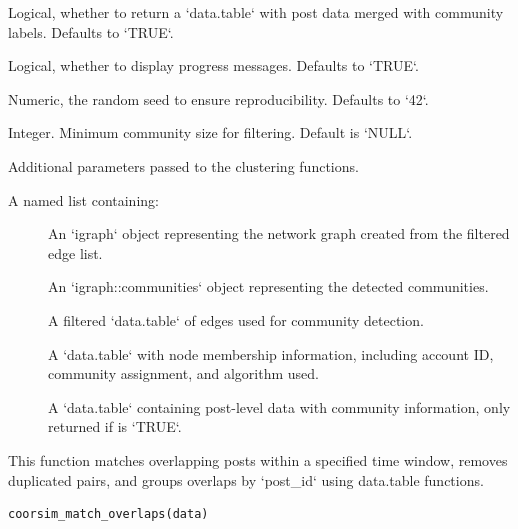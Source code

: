 \documentclass[a4paper]{book}
\begin{document}
\begin{Arguments}
\begin{ldescription}
\item[\code{return\_post\_dt}] Logical, whether to return a `data.table` with post data merged with community labels. 
Defaults to `TRUE`.

\item[\code{verbose}] Logical, whether to display progress messages. Defaults to `TRUE`.

\item[\code{seed}] Numeric, the random seed to ensure reproducibility. Defaults to `42`.

\item[\code{min\_comm\_size}] Integer. Minimum community size for filtering. Default is `NULL`.

\item[\code{...}] Additional parameters passed to the clustering functions.
\end{ldescription}
\end{Arguments}
%
\begin{Value}
A named list containing:
\begin{description}

\item[] An `igraph` object representing the network graph created from the filtered edge list.
\item[] An `igraph::communities` object representing the detected communities.
\item[] A filtered `data.table` of edges used for community detection.
\item[] A `data.table` with node membership information, including account ID, community assignment, and algorithm used.
\item[] A `data.table` containing post-level data with community information, only returned if  is `TRUE`.

\end{description}

\end{Value}
%
\begin{Description}
This function matches overlapping posts within a specified time window, removes duplicated pairs,
and groups overlaps by `post\_id` using data.table functions.
\end{Description}
%
\begin{Usage}
\begin{verbatim}
coorsim_match_overlaps(data)
\end{verbatim}
\end{Usage}
\end{document}
